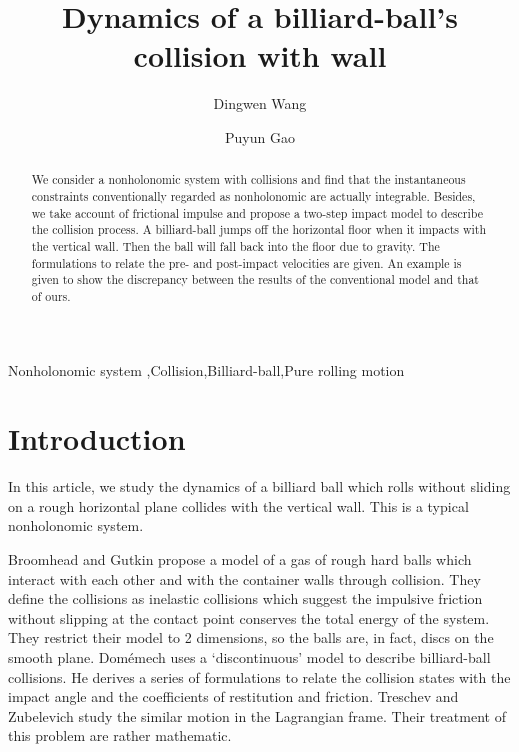 \documentclass[preprint,12pt]{elsarticle}
\begin{document}
\begin{frontmatter}
\title{Dynamics of a billiard-ball's collision with wall}
\author[nudt]{Dingwen Wang}
\author[nudt]{Puyun Gao}

\address[nudt]{College of Aerospace Science and Engineering, National University of Defense Technology, Changsha 410072, PR China}

\begin{abstract}
We consider a nonholonomic system with collisions and find that the instantaneous constraints conventionally regarded as nonholonomic are actually integrable. Besides, we take account of frictional impulse and propose a two-step impact model to describe the collision process. A billiard-ball jumps off the horizontal floor when it impacts with the vertical wall. Then the ball will fall back into the floor due to gravity. The formulations to relate the pre- and post-impact velocities are given. An example is given to show the discrepancy between the results of the conventional model and that of ours.
\end{abstract}
\begin{keyword}
  Nonholonomic system \sep Collision\sep Billiard-ball\sep Pure rolling motion
\end{keyword}
\end{frontmatter}

\graphicspath{{Figures/}}

\section{Introduction}\label{sec:intro}
In this article, we study the dynamics of a billiard ball which rolls without sliding on a rough horizontal plane collides with the vertical wall.
This is a typical nonholonomic system\cite{Neimark,Garwin,Gutkin,Treschev}.

Broomhead and Gutkin propose a model of a gas of rough hard balls which interact with each other and with the container walls through collision. They define the collisions as inelastic collisions which suggest the impulsive friction without slipping at the contact point conserves the total energy of the system. They restrict their model to 2 dimensions, so the balls are, in fact, discs on the smooth plane\cite{Gutkin}.
Dom\'emech uses a `discontinuous' model to describe billiard-ball collisions. He derives a series of formulations to relate the collision states with the impact angle and the coefficients of restitution and friction\cite{Domenech}.
Treschev and Zubelevich study the similar motion in the Lagrangian frame. Their treatment of this problem are rather mathematic\cite{Treschev}.
\end{document}
